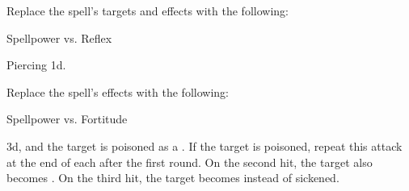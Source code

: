 


Replace the spell's targets and effects with the following:
\begin{spellcontent}

\begin{augmenttargetinginfo}




\end{augmenttargetinginfo}


\begin{augmenteffects}




\begin{spellattack}{Spellpower vs. Reflex}


\spellsuccess Piercing  \plus1d.


\end{spellattack}



\end{augmenteffects}

\end{spellcontent}








Replace the spell's effects with the following:
\begin{spellcontent}

\begin{augmenteffects}




\begin{spellattack}{Spellpower vs. Fortitude}


\spellsuccess
{} \minus3d, and the target is poisoned as a .
If the target is poisoned, repeat this attack at the end of each  after the first round.
On the second hit, the target also becomes .
On the third hit, the target becomes  instead of sickened.



\end{spellattack}





\end{augmenteffects}

\end{spellcontent}





